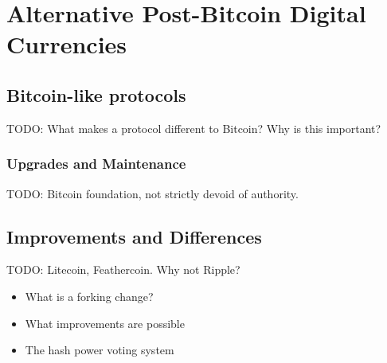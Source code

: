 \section{Alternative Post-Bitcoin Digital Currencies}

\subsection{Bitcoin-like protocols}
TODO: What makes a protocol different to Bitcoin? Why is this important?

\subsubsection{Upgrades and Maintenance}
TODO: Bitcoin foundation, not strictly devoid of authority.

\subsection{Improvements and Differences}
TODO: Litecoin, Feathercoin. Why not Ripple?

\begin{itemize} \item What is a forking change?  \item What improvements are
possible \item The hash power voting system \end{itemize}


%
%

